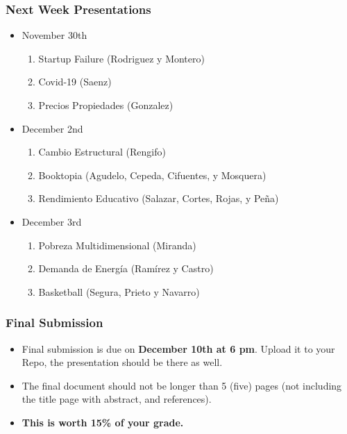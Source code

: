\documentclass[
  shownotes,
  xcolor={svgnames},
  hyperref={colorlinks,citecolor=DarkBlue,linkcolor=DarkRed,urlcolor=DarkBlue}
  , aspectratio=169]{beamer}
\begin{document}
\begin{frame}
\frametitle{Next Week Presentations}


\begin{itemize}
  \item November 30th
  \begin{enumerate}
      \item Startup Failure (Rodriguez y Montero)
      \item Covid-19 (Saenz)
      \item Precios Propiedades (Gonzalez)
    \end{enumerate}
    \item December 2nd
    \begin{enumerate}
      \item Cambio Estructural (Rengifo)
      \item Booktopia (Agudelo, Cepeda, Cifuentes, y Mosquera)
      \item Rendimiento Educativo (Salazar, Cortes, Rojas, y Peña)
      \end{enumerate}
      \item December 3rd
      \begin{enumerate}
        \item Pobreza Multidimensional (Miranda)
        \item Demanda de Energía (Ramírez y Castro)
        \item Basketball (Segura, Prieto y Navarro)
      \end{enumerate}
\end{itemize}
\end{frame}
\begin{frame}
\frametitle{Final Submission}

  \begin{itemize}
  \item Final  submission is due on {\bf December 10th at 6 pm}. Upload it to your Repo, the presentation should be there as well.
  \medskip
  \item  The final document should not be longer than 5 (five) pages (not including the title page with abstract, and references). 
  \medskip
  \item {\bf This is worth 15\% of your grade.}
\end{itemize}

\end{frame}
\end{document}
